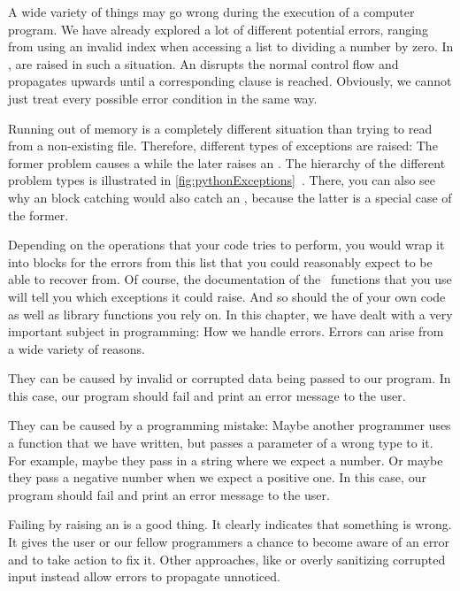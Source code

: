 %
A wide variety of things may go wrong during the execution of a computer program.
We have already explored a lot of different potential errors, ranging from using an invalid index when accessing a list to dividing a number by zero.
In \python,  are raised in such a situation.
An  disrupts the normal control flow and propagates upwards until a corresponding  clause is reached.
Obviously, we cannot just treat every possible error condition in the same way.

Running out of memory is a completely different situation than trying to read from a non-existing file.
Therefore, different types of exceptions are raised:
The former problem causes a  while the later raises an .
The hierarchy of the different problem types is illustrated in \cref{fig:pythonExceptions}~\cite{PSF:P3D:TPSL:BIE}.
There, you can also see why an  block catching  would also catch an , because the latter is a special case of the former.

Depending on the operations that your code tries to perform, you would wrap it into  blocks for the errors from this list that you could reasonably expect to be able to recover from.
Of course, the documentation of the \python\ functions that you use will tell you which exceptions it could raise.
And so should the  of your own code as well as library functions you rely on.%
\endhsection%
%
%
In this chapter, we have dealt with a very important subject in programming:
How we handle errors.
Errors can arise from a wide variety of reasons.

They can be caused by invalid or corrupted data being passed to our program.
In this case, our program should fail and print an error message to the user.

They can be caused by a programming mistake:
Maybe another programmer uses a function that we have written, but passes a parameter of a wrong type to it.
For example, maybe they pass in a string where we expect a number.
Or maybe they pass a negative number when we expect a positive one.
In this case, our program should fail and print an error message to the user.

Failing by raising an  is a good thing.
It clearly indicates that something is wrong.
It gives the user or our fellow programmers a chance to become aware of an error and to take action to fix it.
Other approaches, like  or overly sanitizing corrupted input instead allow errors to propagate unnoticed.

